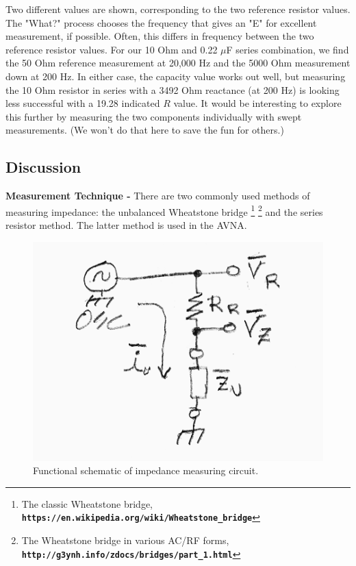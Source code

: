 %
Two different values are shown, corresponding to the two reference resistor values.  The "\textsf{What?}" process chooses the frequency that gives an "E" for excellent measurement, if possible.  Often, this differs in frequency between the two reference resistor values.  For our 10 Ohm and 0.22 $\mu$F series combination, we find the 50 Ohm reference measurement at 20,000 Hz and the 5000 Ohm measurement down at 200 Hz.  In either case, the capacity value works out well, but measuring the 10 Ohm resistor in series with a 3492 Ohm reactance (at 200 Hz) is looking less successful with a 19.28 indicated \(R\) value.  It would be interesting to explore this further by measuring the two components individually with swept measurements. (We won't do that here to save the fun for others.)
%
\subsection{Discussion}
%
\textbf{Measurement Technique - } There are two commonly used methods of measuring impedance: the unbalanced Wheatstone bridge
%
\footnote{The classic Wheatstone bridge, \textbf{\texttt{https://en.wikipedia.org/wiki/Wheatstone\_bridge}}}
\footnote{The Wheatstone bridge in various AC/RF forms, \textbf{\texttt{http://g3ynh.info/zdocs/bridges/part\_1.html}}}
%
 and the series resistor method.   The latter method is used in the AVNA.
\begin{figure}[H]
\begin{center}
\includegraphics[scale=0.75]{./images/AVNA_900.pdf}
\caption{Functional schematic of impedance measuring circuit.}
\label{AVNA_900-label}
\end{center}
\end{figure}
